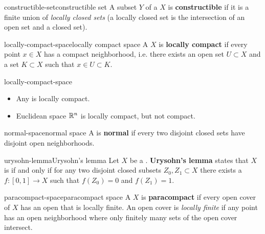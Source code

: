 \begin{topic}{constructible-set}{constructible set}
    A subset $Y$ of a  $X$ is \textbf{constructible} if it is a finite union of \textit{locally closed sets} (a locally closed set is the intersection of an open set and a closed set).
\end{topic}

\begin{topic}{locally-compact-space}{locally compact space}
    A  $X$ is \textbf{locally compact} if every point $x \in X$ has a compact neighborhood, i.e. there exists an open set $U \subset X$ and a  set $K \subset X$ such that $x \in U \subset K$.
\end{topic}

\begin{example}{locally-compact-space}
    \begin{itemize}
        \item Any  is locally compact.
        \item Euclidean space $\mathbb{R}^n$ is locally compact, but not compact.
    \end{itemize}
\end{example}

\begin{topic}{normal-space}{normal space}
    A  is \textbf{normal} if every two disjoint closed sets have disjoint open neighborhoods.
\end{topic}

\begin{topic}{urysohn-lemma}{Urysohn's lemma}
    Let $X$ be a . \textbf{Urysohn's lemma} states that $X$ is  if and only if for any two disjoint closed subsets $Z_0, Z_1 \subset X$ there exists a  $f : [0, 1] \to X$ such that $f(Z_0) = 0$ and $f(Z_1) = 1$.
\end{topic}

\begin{topic}{paracompact-space}{paracompact space}
    A  $X$ is \textbf{paracompact} if every open cover of $X$ has an open  that is locally finite. An open cover is \textit{locally finite} if any point has an open neighborhood where only finitely many sets of the open cover intersect.
\end{topic}

